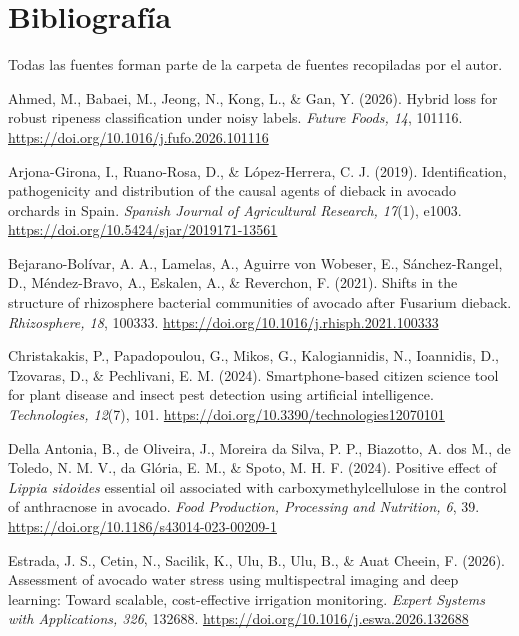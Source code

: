 \documentclass[11pt]{article}
\begin{document}
\section*{Bibliografía}
{\small Todas las fuentes forman parte de la carpeta de fuentes recopiladas por el autor.\par}
\begin{list}{}{\leftmargin=1.27cm \itemindent=-1.27cm \itemsep=4pt \parsep=0pt}
\item Ahmed, M., Babaei, M., Jeong, N., Kong, L., \& Gan, Y. (2026). Hybrid loss for robust ripeness classification under noisy labels. \textit{Future Foods, 14}, 101116. \url{https://doi.org/10.1016/j.fufo.2026.101116}
\item Arjona-Girona, I., Ruano-Rosa, D., \& López-Herrera, C. J. (2019). Identification, pathogenicity and distribution of the causal agents of dieback in avocado orchards in Spain. \textit{Spanish Journal of Agricultural Research, 17}(1), e1003. \url{https://doi.org/10.5424/sjar/2019171-13561}
\item Bejarano-Bolívar, A. A., Lamelas, A., Aguirre von Wobeser, E., Sánchez-Rangel, D., Méndez-Bravo, A., Eskalen, A., \& Reverchon, F. (2021). Shifts in the structure of rhizosphere bacterial communities of avocado after Fusarium dieback. \textit{Rhizosphere, 18}, 100333. \url{https://doi.org/10.1016/j.rhisph.2021.100333}
\item Christakakis, P., Papadopoulou, G., Mikos, G., Kalogiannidis, N., Ioannidis, D., Tzovaras, D., \& Pechlivani, E. M. (2024). Smartphone-based citizen science tool for plant disease and insect pest detection using artificial intelligence. \textit{Technologies, 12}(7), 101. \url{https://doi.org/10.3390/technologies12070101}
\item Della Antonia, B., de Oliveira, J., Moreira da Silva, P. P., Biazotto, A. dos M., de Toledo, N. M. V., da Glória, E. M., \& Spoto, M. H. F. (2024). Positive effect of \textit{Lippia sidoides} essential oil associated with carboxymethylcellulose in the control of anthracnose in avocado. \textit{Food Production, Processing and Nutrition, 6}, 39. \url{https://doi.org/10.1186/s43014-023-00209-1}
\item Estrada, J. S., Cetin, N., Sacilik, K., Ulu, B., Ulu, B., \& Auat Cheein, F. (2026). Assessment of avocado water stress using multispectral imaging and deep learning: Toward scalable, cost-effective irrigation monitoring. \textit{Expert Systems with Applications, 326}, 132688. \url{https://doi.org/10.1016/j.eswa.2026.132688}

\end{list}
\end{document}
